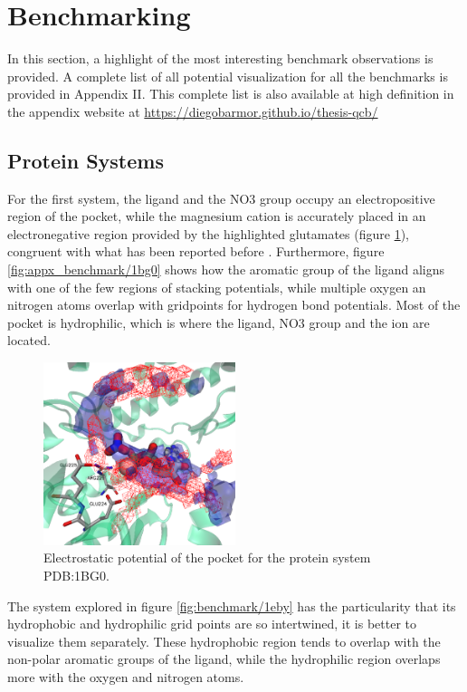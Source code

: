 \section{Benchmarking}
  In this section, a highlight of the most interesting benchmark observations is provided. A complete list of all potential visualization for all the benchmarks is provided in Appendix II. This complete list is also available at high definition in the appendix website at \url{https://diegobarmor.github.io/thesis-qcb/}

  \subsection{Protein Systems}
    For the first system, the ligand and the NO3 group occupy an electropositive region of the pocket, while the magnesium cation is accurately placed in an electronegative region provided by the highlighted glutamates (figure \ref{fig:benchmark/1bg0}), congruent with what has been reported before \cite{benchmark_negative_2000}. Furthermore, figure \ref{fig:appx_benchmark/1bg0} shows how the aromatic group of the ligand aligns with one of the few regions of stacking potentials, while multiple oxygen an nitrogen atoms overlap with gridpoints for hydrogen bond potentials. Most of the pocket is hydrophilic, which is where the ligand, NO3 group and the ion are located.

    \begin{figure}[H]
      \centering
      \includegraphics[width=0.5\textwidth]{figures/results/benchmark_prot/1bg0.png}
      \caption{\label{fig:benchmark/1bg0} Electrostatic potential of the pocket for the protein system PDB:1BG0.}
    \end{figure}

    The system explored in figure \ref{fig:benchmark/1eby} has the particularity that its hydrophobic and hydrophilic grid points are so intertwined, it is better to visualize them separately. These hydrophobic region tends to overlap with the non-polar aromatic groups of the ligand, while the hydrophilic region overlaps more with the oxygen and nitrogen atoms.

